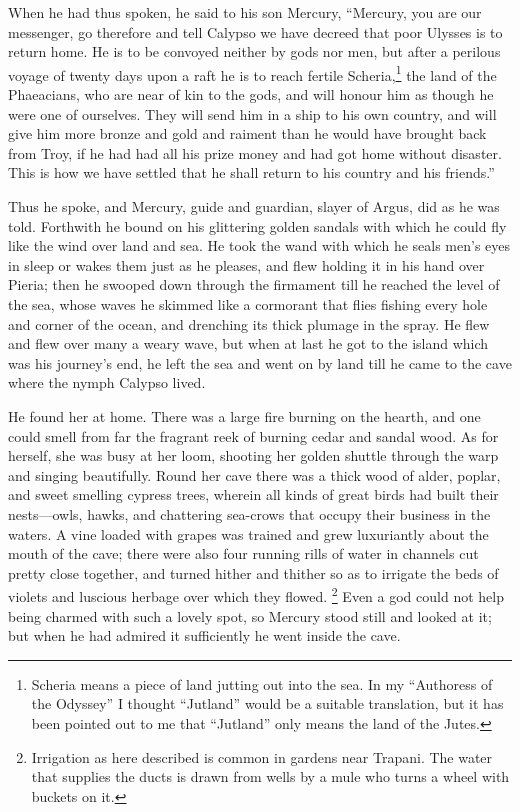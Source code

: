 When he had thus spoken, he said to his son Mercury, “Mercury, you are our
messenger, go therefore and tell Calypso we have decreed that poor Ulysses is
to return home. He is to be convoyed neither by gods nor men, but after a
perilous voyage of twenty days upon a raft he is to reach fertile Scheria,\footnote{Scheria means a piece of land jutting out into the sea. In my “Authoress of
the Odyssey” I thought “Jutland” would be a suitable translation, but it has
been pointed out to me that “Jutland” only means the land of the Jutes.} the land of the
Phaeacians, who are near of kin to the gods, and will honour him as though he
were one of ourselves. They will send him in a ship to his own country, and
will give him more bronze and gold and raiment than he would have brought back
from Troy, if he had had all his prize money and had got home without disaster.
This is how we have settled that he shall return to his country and his
friends.”

Thus he spoke, and Mercury, guide and guardian, slayer of Argus, did as he was
told. Forthwith he bound on his glittering golden sandals with which he could
fly like the wind over land and sea. He took the wand with which he seals men’s
eyes in sleep or wakes them just as he pleases, and flew holding it in his hand
over Pieria; then he swooped down through the firmament till he reached the
level of the sea, whose waves he skimmed like a cormorant that flies fishing
every hole and corner of the ocean, and drenching its thick plumage in the
spray. He flew and flew over many a weary wave, but when at last he got to the
island which was his journey’s end, he left the sea and went on by land till he
came to the cave where the nymph Calypso lived.

He found her at home. There was a large fire burning on the hearth, and one
could smell from far the fragrant reek of burning cedar and sandal wood. As for
herself, she was busy at her loom, shooting her golden shuttle through the warp
and singing beautifully. Round her cave there was a thick wood of alder,
poplar, and sweet smelling cypress trees, wherein all kinds of great birds had
built their nests—owls, hawks, and chattering sea-crows that occupy their
business in the waters. A vine loaded with grapes was trained and grew
luxuriantly about the mouth of the cave; there were also four running rills of
water in channels cut pretty close together, and turned hither and thither so
as to irrigate the beds of violets and luscious herbage over which they flowed.
\footnote{Irrigation as here described is common in gardens near Trapani. The water
that supplies the ducts is drawn from wells by a mule who turns a wheel with
buckets on it.} Even a god
could not help being charmed with such a lovely spot, so Mercury stood still
and looked at it; but when he had admired it sufficiently he went inside the
cave.

